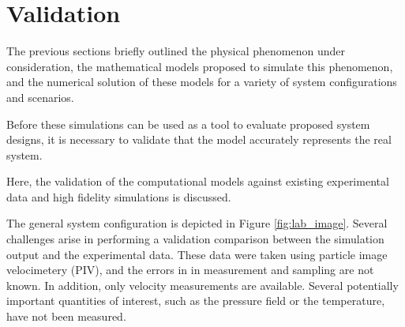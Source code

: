 
\section{Validation}
\label{sec:validation}

%
%
%

%
%

The previous sections briefly outlined the physical phenomenon under
consideration, the mathematical models proposed to simulate this phenomenon,
and the numerical solution of these models 
for a variety of system configurations and scenarios. 

Before these simulations can be used as a tool to evaluate proposed system 
designs, it is necessary to validate that the model accurately represents 
the real system. 

Here, the validation of the computational models
against existing experimental data and high fidelity simulations is 
discussed.

%
%

The general system configuration is depicted
in Figure \ref{fig:lab_image}. 
Several challenges arise in performing a validation comparison between the
simulation output and the experimental data. These data were taken using
particle image velocimetery (PIV), and the errors in 
in measurement and sampling are not known. 
In addition, only velocity measurements are available. Several
potentially important quantities of interest, such as the pressure field
or the temperature, have not been measured.





